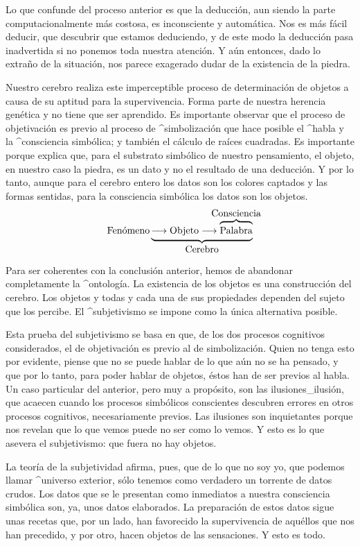 Lo que confunde del proceso anterior es que la deducción, aun siendo la
parte computacionalmente más costosa, es inconsciente y automática. Nos
es más fácil deducir, que descubrir que estamos deduciendo, y de este
modo la deducción pasa inadvertida si no ponemos toda nuestra atención.
Y aún entonces, dado lo extraño de la situación, nos parece exagerado
dudar de la existencia de la piedra.

Nuestro cerebro realiza este imperceptible proceso de determinación de
objetos a causa de su aptitud para la supervivencia. Forma parte de
nuestra herencia genética y no tiene que ser aprendido. Es importante
observar que el proceso de objetivación es previo al proceso de
^{simbolización} que hace posible el ^{habla} y la ^{consciencia}
simbólica; y también el cálculo de raíces cuadradas. Es importante
porque explica que, para el substrato simbólico de nuestro pensamiento,
el objeto, en nuestro caso la piedra, es un dato y no el resultado de
una deducción. Y por lo tanto, aunque para el cerebro entero los datos
son los colores captados y las formas sentidas, para la consciencia
simbólica los datos son los objetos.
$$\hbox{Fenómeno} \underbrace{\longrightarrow \hbox{Objeto}
 \longrightarrow
 \overbrace{\hbox{\strut Palabra}}^{\hbox to 0pt{\hss
  Consciencia\hss}}}_{\hbox{Cerebro}}$$

Para ser coherentes con la conclusión anterior, hemos de abandonar
completamente la ^{ontología}. La existencia de los objetos es una
construcción del cerebro. Los objetos y todas y cada una de sus
propiedades dependen del sujeto que los percibe. El ^{subjetivismo} se
impone como la única alternativa posible.

Esta prueba del subjetivismo se basa en que, de los dos procesos
cognitivos considerados, el de objetivación es previo al de
simbolización. Quien no tenga esto por evidente, piense que no se puede
hablar de lo que aún no se ha pensado, y que por lo tanto, para poder
hablar de objetos, éstos han de ser previos al habla. Un caso particular
del anterior, pero muy a propósito, son las ilusiones_{ilusión}, que
acaecen cuando los procesos simbólicos conscientes descubren errores en
otros procesos cognitivos, necesariamente previos. Las ilusiones son
inquietantes porque nos revelan que lo que vemos puede no ser como lo
vemos. Y esto es lo que asevera el subjetivismo: que fuera no hay
objetos.

La teoría de la subjetividad afirma, pues, que de lo que no soy yo, que
podemos llamar ^{universo} exterior, sólo tenemos como verdadero un
torrente de datos crudos. Los datos que se le presentan como inmediatos
a nuestra consciencia simbólica son, ya, unos datos elaborados. La
preparación de estos datos sigue unas recetas que, por un lado, han
favorecido la supervivencia de aquéllos que nos han precedido, y por
otro, hacen objetos de las sensaciones. Y esto es todo.

